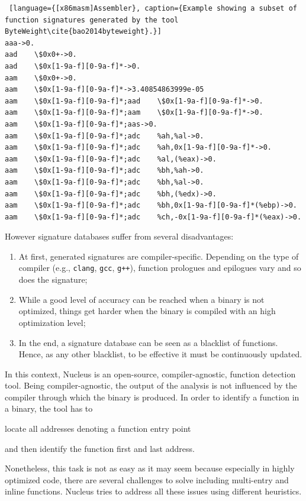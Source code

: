 \documentclass[LaM,binding=0.6cm]{sapthesis}
\begin{document}
\begin{lstlisting} [language={[x86masm]Assembler}, caption={Example showing a subset of function signatures generated by the tool ByteWeight\cite{bao2014byteweight}.}]
aaa->0.
aad    \$0x0+->0.
aad    \$0x[1-9a-f][0-9a-f]*->0.
aam    \$0x0+->0.
aam    \$0x[1-9a-f][0-9a-f]*->3.40854863999e-05
aam    \$0x[1-9a-f][0-9a-f]*;aad    \$0x[1-9a-f][0-9a-f]*->0.
aam    \$0x[1-9a-f][0-9a-f]*;aam    \$0x[1-9a-f][0-9a-f]*->0.
aam    \$0x[1-9a-f][0-9a-f]*;aas->0.
aam    \$0x[1-9a-f][0-9a-f]*;adc    %ah,%al->0.
aam    \$0x[1-9a-f][0-9a-f]*;adc    %ah,0x[1-9a-f][0-9a-f]*->0.
aam    \$0x[1-9a-f][0-9a-f]*;adc    %al,(%eax)->0.
aam    \$0x[1-9a-f][0-9a-f]*;adc    %bh,%ah->0.
aam    \$0x[1-9a-f][0-9a-f]*;adc    %bh,%al->0.
aam    \$0x[1-9a-f][0-9a-f]*;adc    %bh,(%edx)->0.
aam    \$0x[1-9a-f][0-9a-f]*;adc    %bh,0x[1-9a-f][0-9a-f]*(%ebp)->0.
aam    \$0x[1-9a-f][0-9a-f]*;adc    %ch,-0x[1-9a-f][0-9a-f]*(%eax)->0.
\end{lstlisting}

However signature databases suffer from several disadvantages:
\begin{enumerate}
\item At first, generated signatures are compiler-specific. Depending on the type of compiler (e.g., \texttt{clang}, \texttt{gcc}, \texttt{g++}), function prologues and epilogues vary and so does the signature;
\item While a good level of accuracy can be reached when a binary is not optimized, things get harder when the binary is compiled with an high optimization level;
\item In the end, a signature database can be seen as a blacklist of functions. Hence, as any other blacklist, to be effective it must be continuously updated.
\end{enumerate}
In this context, Nucleus is an open-source, compiler-agnostic, function detection tool. Being compiler-agnostic, the output of the analysis is not influenced by the compiler through which the binary is produced. In order to identify a function in a binary, the tool has to 
\begin{enumerate*}[label=\roman*),itemjoin={,\quad}]
\item locate all addresses denoting a function entry point
\item and then identify the function first and last address.
\end{enumerate*}
Nonetheless, this task is not as easy as it may seem because especially in highly optimized code, there are several challenges to solve including multi-entry and inline functions. Nucleus tries to address all these issues using different heuristics.\\
\end{document}
